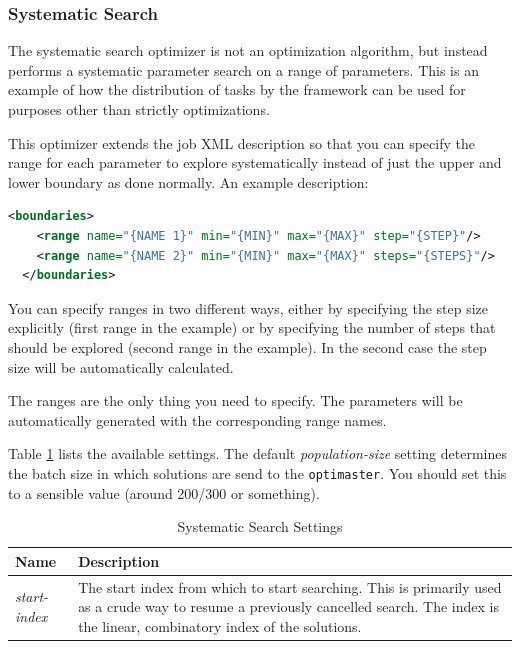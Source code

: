 \documentclass{article}
\begin{document}
\subsubsection{Systematic Search}
The systematic search optimizer is not an optimization algorithm, but instead
performs a systematic parameter search on a range of parameters. This is an
example of how the distribution of tasks by the framework can be used for
purposes other than strictly optimizations.

This optimizer extends the job XML description so that you can specify the
range for each parameter to explore systematically instead of just the upper
and lower boundary as done normally. An example description:

\begin{lstlisting}[language=xml]
  <boundaries>
    <range name="{NAME 1}" min="{MIN}" max="{MAX}" step="{STEP}"/>
    <range name="{NAME 2}" min="{MIN}" max="{MAX}" steps="{STEPS}"/>
  </boundaries>
\end{lstlisting}

You can specify ranges in two different ways, either by specifying the step
size explicitly (first range in the example) or by specifying the number of
steps that should be explored (second range in the example). In the second case
the step size will be automatically calculated.

The ranges are the only thing you need to specify. The parameters will be
automatically generated with the corresponding range names.

Table \ref{tab:systematic_settings} lists the available settings. The
default \textit{population-size} setting determines the batch size in which
solutions are send to the \verb!optimaster!. You should set this to a
sensible value (around 200/300 or something).

\begin{table}[h!tb]\caption{Systematic Search Settings}\label{tab:systematic_settings}\vspace{0.1in}
	\centering

	\begin{tabular}{p{4cm} p{10cm}}
		\toprule
		\textbf{Name} & \textbf{Description} \\
		\midrule
		\textit{start-index} & The start index from which to start searching.
		                       This is primarily used as a crude way to resume
		                       a previously cancelled search. The index is the
		                       linear, combinatory index of the solutions. \\
		\bottomrule
	\end{tabular}
\end{table}
\end{document}
